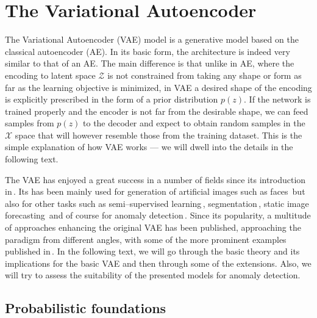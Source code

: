 \section{The Variational Autoencoder}

The Variational Autoencoder (VAE) model is a generative model based
on the classical autoencoder (AE). In its basic form, the architecture
is indeed very similar to that of an AE. The main difference is that
unlike in AE, where the encoding to latent space $\mathcal{Z}$ is
not constrained from taking any shape or form as far as the learning
objective is minimized, in VAE a desired shape of the encoding is
explicitly prescribed in the form of a prior distribution $p(z)$.
If the network is trained properly and the encoder is not far from
the desirable shape, we can feed samples from $p(z)$ to the decoder
and expect to obtain random samples in the $\mathcal{X}$ space that
will however resemble those from the training dataset. This is the
simple explanation of how VAE works --- we will dwell into the details
in the following text.

The VAE has enjoyed a great success in a number of fields since its
introduction in\,\cite{kingma2013vae}. Its has been mainly used
for generation of artificial images such as faces\,\cite{rezende2014stochastic}
but also for other tasks such as semi--supervised learning\,\cite{kingma2014semi},
segmentation\,\cite{sohn2015learning}, static image forecasting\,\cite{walker2016uncertain}
and of course for anomaly detection\,\cite{an2015variational,xu2018unsupervised,solch2016variational}.
Since its popularity, a multitude of approaches enhancing the original
VAE has been published, approaching the paradigm from different angles,
with some of the more prominent examples published in\,\cite{higgins2017beta,zhao2017infovae,tolstikhin2017wasserstein,makhzani2015adversarial,pu2017adversarial}.
In the following text, we will go through the basic theory and its
implications for the basic VAE and then through some of the extensions.
Also, we will try to assess the suitability of the presented models
for anomaly detection.

\subsection{Probabilistic foundations}

